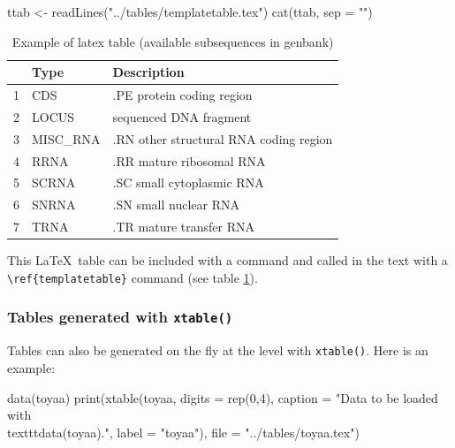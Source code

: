 \documentclass{article}
\begin{document}
\begin{Schunk}
\begin{Sinput}
 ttab <- readLines("../tables/templatetable.tex")
 cat(ttab, sep = "\n")
\end{Sinput}
\begin{Soutput}
\begin{table}[ht]
\begin{center}
\begin{tabular}{rll}
\hline
 & Type & Description \\
\hline
1 &      CDS &              .PE protein coding region \\
2 &    LOCUS &                 sequenced DNA fragment \\
3 & MISC\_RNA & .RN other structural RNA coding region \\
4 &     RRNA &               .RR mature ribosomal RNA \\
5 &    SCRNA &              .SC small cytoplasmic RNA \\
6 &    SNRNA &                  .SN small nuclear RNA \\
7 &     TRNA &                .TR mature transfer RNA \\
\hline
\end{tabular}
\caption{Example of latex table (available subsequences in genbank)}
\label{templatetable}
\end{center}
\end{table}
\end{Soutput}
\end{Schunk}

This \LaTeX~table can be included with a
\verb!! 
command and called
in the text with a \verb!\ref{templatetable}! command (see
table \ref{templatetable}).

 

\subsubsection{Tables generated with \texttt{xtable()}}

Tables can also be generated on the fly at the \Rlogo{} level
with \texttt{xtable()}. Here is an example:

\begin{Schunk}
\begin{Sinput}
 data(toyaa)
 print(xtable(toyaa, 
   digits = rep(0,4), 
   caption = "Data to be loaded with \\texttt{data(toyaa).}", 
   label = "toyaa"), 
   file = "../tables/toyaa.tex")
\end{Sinput}
\end{Schunk}
\end{document}
